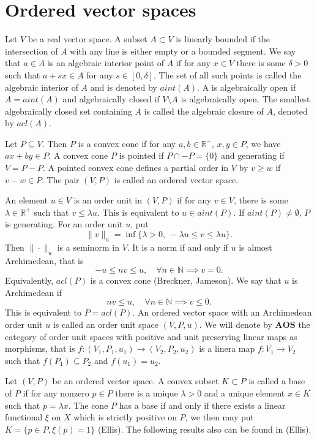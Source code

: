 \documentclass[12pt]{article}
\newcommand{\<}{\langle}
\newcommand{\ct}[1]{\mathbf{#1}}
\begin{document}
\section{Ordered vector spaces }

Let $V$ be a real vector space. A subset $A\subset V$ is linearly bounded if the intersection of $A$ with any line is either empty or a bounded segment.
We say that $a\in A$ is an algebraic interior point of $A$ if for any $x\in V$ there is some $\delta>0$ such that $a+sx\in A$ for any $s\in [0,\delta]$. The set of all such points is called the algebraic interior of $A$ and is denoted by $aint(A)$. A is algebraically open if $A=aint(A)$ and algebraically closed if $V\setminus A$ is algebraically open. The smallest algebraically closed  set containing $A$ is called the algebraic closure of $A$, denoted by $acl(A)$. 


Let $P\subseteq V$. Then $P$ is a convex cone if for any $a,b\in \mathbb R^+$, $x,y\in P$, we have $ax+by\in P$. A convex cone $P$ is pointed
 if $P\cap -P=\{0\}$ and generating if $V=P-P$. A pointed convex cone defines a partial order in $V$ by $v\ge w$ if $v-w\in P$. 
 The pair $(V,P)$ is called an ordered vector space.

 An element $u\in V$ is an order unit in $(V,P)$ if for any $v\in V$, there is some $\lambda\in \mathbb R^+$ such that 
 $v\le \lambda u$. This is equivalent to $u\in aint(P)$. If $aint(P)\ne \emptyset$, $P$ is generating.  For an order unit $u$, put
 \[
\|v\|_u=\inf\{\lambda>0,\ -\lambda u\le v\le \lambda u\}.
 \]
Then $\|\cdot\|_u$ is a seminorm in $V$. It is a norm if and only if  $u$ is almost Archimedean, that is
\[
-u\le nv \le u,\quad \forall n\in \mathbb N \implies v=0.
\]
Equivalently, $acl(P)$ is a convex cone (Breckner, Jameson). We say that $u$ is Archimedean if 
\[
nv\le u,\quad \forall n\in \mathbb N \implies v\le 0.
\]
This is equivalent to $P=acl(P)$. An ordered vector space with an Archimedean order unit $u$ is called an order unit space $(V,P,u)$.
We will denote by $\ct{AOS}$ the category of order unit spaces with positive and unit preserving linear maps as morphisms, that is $f: (V_1,P_1,u_1)\to (V_2,P_2,u_2)$ is a linera map $f:V_1\to V_2$ such that $f(P_1)\subseteq P_2$ and $f(u_1)=u_2$.

Let $(V,P)$ be an ordered vector space. A convex subset $K\subset P$ is called a base of $P$ if for any nonzero $p\in P$ there is a unique $\lambda>0$ and a unique element $x\in K$ such that $p=\lambda x$. The cone $P$ has a base if and only if there exists a linear functional $\xi$ on $X$ which is strictly positive on $P$, we then may put $K=\{p\in P, \xi(p)=1\}$ (Ellis). The following results also can be found in (Ellis). 
\end{document}
